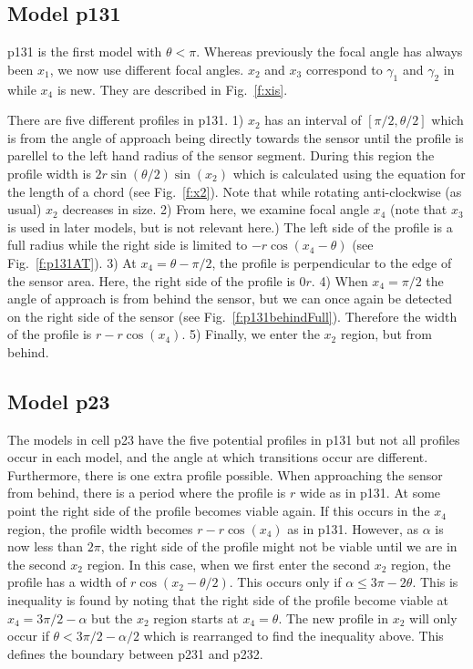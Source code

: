 \subsection{Model p131} \label{p131}

p131 is the first model with $\theta < \pi$. Whereas previously the focal angle has always been $x_1$, we now use different focal angles. $x_2$ and $x_3$ correspond to $\gamma_1$ and $\gamma_2$ in \cite{rowcliffe2008estimating} while $x_4$ is new. They are described in Fig.~\ref{f:xis}. 

There are five different profiles in p131. 1) $x_2$ has an interval of $[\pi/2, \theta/2]$ which is from the angle of approach being directly towards the sensor until the profile is parellel to the left hand radius of the sensor segment. During this region the profile width is $2r\sin\left(\theta/2\right)\sin(x_2)$ which is calculated using the equation for the length of a chord (see Fig.~\ref{f:x2}). Note that while rotating anti-clockwise (as usual) $x_2$ decreases in size. 2) From here, we examine focal angle $x_4$ (note that $x_3$ is used in later models, but is not relevant here.)  The left side of the profile is a full radius while the right side is limited to $- r\cos(x_4 - \theta)$ (see Fig.~\ref{f:p131AT}). 3) At $x_4 =  \theta - \pi/2$, the profile is perpendicular to the edge of the sensor area. Here, the right side of the profile is $0r$. 4) When $x_4 = \pi/2$ the angle of approach is from behind the sensor, but we can once again be detected on the right side of the sensor (see Fig.~\ref{f:p131behindFull}). Therefore the width of the profile is $r - r\cos(x_4)$. 5) Finally, we enter the $x_2$ region, but from behind. 



\subsection{Model p23} \label{p23}

The models in cell p23 have the five potential profiles in p131 but not all profiles occur in each model, and the angle at which transitions occur are different. Furthermore, there is one extra profile possible. When approaching the sensor from behind, there is a period where the profile is $r$ wide as in p131. At some point the right side of the profile becomes viable again. If this occurs in the $x_4$ region, the profile width becomes  $r - r\cos(x_4)$ as in p131. However, as $\alpha$ is now less than $2\pi$, the right side of the profile might not be viable until we are in the second $x_2$ region. In this case, when we first enter the second $x_2$ region, the profile has a width of $r\cos(x_2 - \theta/2)$. This occurs only if $\alpha \le 3\pi - 2\theta$. This is inequality is found by noting that the right side of the profile become viable at $x_4 = 3\pi/2 - \alpha$ but the $x_2$ region starts at $x_4 = \theta$. The new profile in $x_2$ will only occur if  $ \theta < 3\pi/2 - \alpha/2$ which is rearranged to find the inequality above. This defines the boundary between p231 and p232.

